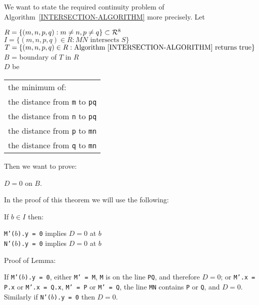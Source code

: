 \documentclass[12pt]{article}
\begin{document}
We want to state the required continuity problem of
Algorithm~\ref{INTERSECTION-ALGORITHM} more precisely.
Let
\begin{center}
$R=\{(m,n,p,q): m\neq n, p\neq q\} \subset {\cal R}^8$ \\
$I=\{(m,n,p,q)\in R: MN \textrm{~intersects~} S\}$ \\
$T=\{(m,n,p,q)\in R:
     \textrm{Algorithm~\ref{INTERSECTION-ALGORITHM} returns true}\}$ \\
$B$ = boundary of $T$ in $R$ \\
$D$ be \begin{tabular}[t]{@{}l}
the minimum of: \\
the distance from {\tt m} to {\tt pq} \\
the distance from {\tt n} to {\tt pq} \\
the distance from {\tt p} to {\tt mn} \\
the distance from {\tt q} to {\tt mn} \\
\end{tabular}
\end{center}

Then we want to prove:
\begin{theorem}
$D = 0$ on $B$.
\end{theorem}

In the proof of this theorem we will use the following:
\begin{lemma}
If $b\in I$ then:
\begin{indpar}{0.5in}
{\tt M'($b$).y = 0} implies $D=0$ at $b$ \\
{\tt N'($b$).y = 0} implies $D=0$ at $b$
\end{indpar}
\end{lemma}

\begin{indpar}{0.3in}
Proof of Lemma:

If {\tt M'($b$).y = 0}, either {\tt M' = M}, {\tt M} is on
the line {\tt PQ}, and therefore $D=0$;
or {\tt M'.x = P.x} or {\tt M'.x = Q.x},
{\tt M' = P} or {\tt M' = Q}, the line {\tt MN}
contains {\tt P} or {\tt Q}, and $D=0$.
Similarly if {\tt N'($b$).y = 0} then $D=0$.
\end{indpar}
\end{document}
